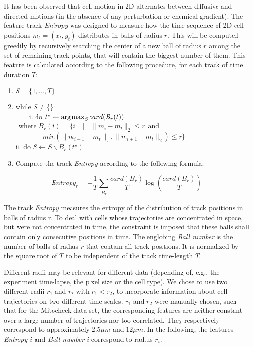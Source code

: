 It has been observed that cell motion in 2D alternates between
diffusive and directed motions (in the absence of any perturbation or
chemical gradient). %
The feature track \textit{Entropy} was designed to measure how the time
sequence of 2D cell positions $m_t=(x_t, y_t)$ distributes in balls of radius $r$. This will be computed greedily by recursively searching the center of a new ball of radius $r$ among the set of remaining track points, that will contain the biggest number of them. This
feature is calculated according to the following procedure, for each
track of time duration $T$: 
\begin{enumerate}
\item $S = \{1, \ldots, T\}$ 
\item while $S\neq\{\}$:\\
\ \ \ \ i. do $t^\star\leftarrow \operatorname*{arg\,max}_S card(B_r(t))$ \\ \ where
$B_r(t) = \{ i \quad | \quad \|m_i-m_t\|_2 \leq r \,\,\, \mbox{and}$ \\
\indent $\quad \quad \quad \quad min{(\|m_{i-1}-m_t\|_2,\|m_{i+1}-m_t\|_2)} \leq r \}$ \\
ii. do $S \leftarrow S \backslash B_r(t^\star) $

\item Compute the track \textit{Entropy} according to the following formula:
\end{enumerate}
\begin{equation}
Entropy_r= -\dfrac{1}{T} \sum_{\substack{B_r}} \dfrac{card(B_{r})}{T} \log(\dfrac{card(B_{r})}{T})
\end{equation}

The track \textit{Entropy} measures the entropy of the distribution of track positions in balls of radius r. To deal with cells whose trajectories are concentrated in space, but were not concentrated in time, the constraint is imposed that these balls shall contain only consecutive positions in time. The englobing \textit{Ball number} is the number of balls of radius $r$ that contain all track positions. It is normalized by the square root of $T$ to be independent of the track time-length $T$.

Different radii may be relevant for different data (depending of,
e.g., the experiment time-lapse, the pixel size or the cell type). We
chose to use two different radii $r_1$ and $r_2$ with $r_1<r_2$, to
incorporate information about cell trajectories on two different
time-scales. $r_1$ and $r_2$ were manually chosen, such that for the Mitocheck data set, the corresponding features are neither constant over a large number of trajectories nor too correlated. They respectively correspond to approximately $2.5\mu m$ and $12\mu
m$. In the following, the features \textit{Entropy $i$} and 
\textit{Ball number $i$} correspond to radius $r_i$.  

